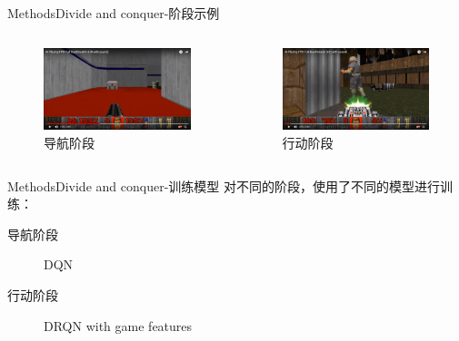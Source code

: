 \documentclass[10pt]{beamer}
\begin{document}
	\begin{frame}{Methods}{Divide and conquer-阶段示例}
		\begin{columns}
			\begin{column}{.5\linewidth}
				\begin{figure}
					\centering
					\includegraphics[width=0.9\linewidth]{pictures/deathmatch-2}
					\caption{导航阶段}
					\label{fig:deathmatch-2}
				\end{figure}
			\end{column}
			\begin{column}{.5\linewidth}
				\begin{figure}
					\centering
					\includegraphics[width=0.9\linewidth]{pictures/deathmatch-3}
					\caption{行动阶段}
					\label{fig:deathmatch-3}
				\end{figure}
				
			\end{column}
		\end{columns}
	\end{frame}

	\begin{frame}{Methods}{Divide and conquer-训练模型}
		对不同的阶段，使用了不同的模型进行训练：
		\begin{description}
			\item[导航阶段] DQN
			\item[行动阶段] DRQN with game features
		\end{description}
		
		
	\end{frame}
\end{document}
